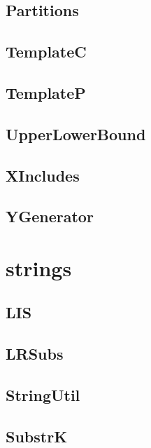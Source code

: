 \subsection{ Partitions}
\raggedbottom
\hrulefill
\subsection{ TemplateC}
\raggedbottom
\hrulefill
\subsection{ TemplateP}
\raggedbottom
\hrulefill
\subsection{ UpperLowerBound}
\raggedbottom
\hrulefill
\subsection{ XIncludes}
\raggedbottom
\hrulefill
\subsection{ YGenerator}
\raggedbottom
\hrulefill

\section{strings}
\subsection{ LIS}
\raggedbottom
\hrulefill
\subsection{ LRSubs}
\raggedbottom
\hrulefill
\subsection{ StringUtil}
\raggedbottom
\hrulefill
\subsection{ SubstrK}
\raggedbottom
\hrulefill

